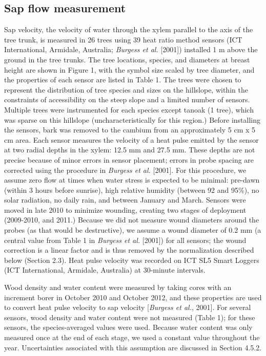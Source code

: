\subsection{Sap flow measurement}
Sap velocity, the velocity of water through the xylem parallel to the axis of the tree trunk, is measured in 26 trees using 39 heat ratio method sensors (ICT International, Armidale, Australia; \textit{Burgess et al.} [2001]) installed 1 m above the ground in the tree trunks.  The tree locations, species, and diameters at breast height are shown in Figure 1, with the symbol size scaled by tree diameter, and the properties of each sensor are listed in Table 1.  The trees were chosen to represent the distribution of tree species and sizes on the hillslope, within the constraints of accessibility on the steep slope and a limited number of sensors.  Multiple trees were instrumented for each species except tanoak (1 tree), which was sparse on this hillslope (uncharacteristically for this region.)  Before installing the sensors, bark was removed to the cambium from an approximately 5 cm x 5 cm area.  Each sensor measures the velocity of a heat pulse emitted by the sensor at two radial depths in the xylem: 12.5 mm and 27.5 mm.  These depths are not precise because of minor errors in sensor placement; errors in probe spacing are corrected using the procedure in \textit{Burgess et al.} [2001].  For this procedure, we assume zero flow at times when water stress is expected to be minimal: pre-dawn (within 3 hours before sunrise), high relative humidity (between 92 and 95\%), no solar radiation, no daily rain, and between January and March.  Sensors were moved in late 2010 to minimize wounding, creating two stages of deployment (2009-2010, and 2011.)  Because we did not measure wound diameters around the probes (as that would be destructive), we assume a wound diameter of 0.2 mm (a central value from Table 1 in \textit{Burgess et al.} [2001]) for all sensors; the wound correction is a linear factor and is thus removed by the normalization described below (Section 2.3).  Heat pulse velocity was recorded on ICT SL5 Smart Loggers (ICT International, Armidale, Australia) at 30-minute intervals.

Wood density and water content were measured by taking cores with an increment borer in October 2010 and October 2012, and these properties are used to convert heat pulse velocity to sap velocity [\textit{Burgess et al.}, 2001].  For several sensors, wood density and water content were not measured (Table 1); for these sensors, the species-averaged values were used.  Because water content was only measured once at the end of each stage, we used a constant value throughout the year.  Uncertainties associated with this assumption are discussed in Section 4.5.2.

